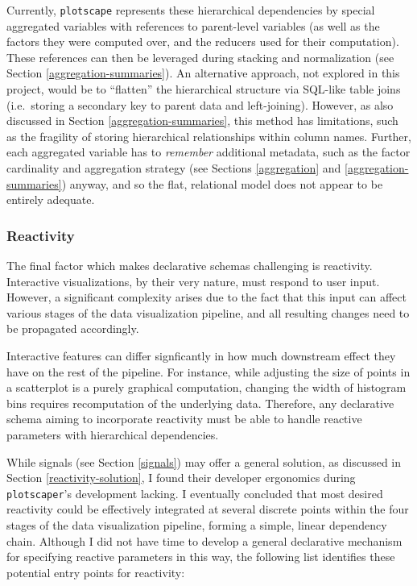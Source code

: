 \documentclass[
  openany]{book}
\theoremstyle{definition}
\theoremstyle{definition}
\theoremstyle{definition}
\theoremstyle{definition}
\theoremstyle{remark}
\begin{document}
Currently, \texttt{plotscape} represents these hierarchical dependencies by special aggregated variables with references to parent-level variables (as well as the factors they were computed over, and the reducers used for their computation). These references can then be leveraged during stacking and normalization (see Section \ref{aggregation-summaries}). An alternative approach, not explored in this project, would be to ``flatten'' the hierarchical structure via SQL-like table joins (i.e.~storing a secondary key to parent data and left-joining). However, as also discussed in Section \ref{aggregation-summaries}, this method has limitations, such as the fragility of storing hierarchical relationships within column names. Further, each aggregated variable has to \emph{remember} additional metadata, such as the factor cardinality and aggregation strategy (see Sections \ref{aggregation} and \ref{aggregation-summaries}) anyway, and so the flat, relational model does not appear to be entirely adequate.

\subsubsection{Reactivity}\label{reactivity-1}

The final factor which makes declarative schemas challenging is reactivity. Interactive visualizations, by their very nature, must respond to user input. However, a significant complexity arises due to the fact that this input can affect various stages of the data visualization pipeline, and all resulting changes need to be propagated accordingly.

Interactive features can differ signficantly in how much downstream effect they have on the rest of the pipeline. For instance, while adjusting the size of points in a scatterplot is a purely graphical computation, changing the width of histogram bins requires recomputation of the underlying data. Therefore, any declarative schema aiming to incorporate reactivity must be able to handle reactive parameters with hierarchical dependencies.

While signals (see Section \ref{signals}) may offer a general solution, as discussed in Section \ref{reactivity-solution}, I found their developer ergonomics during \texttt{plotscaper}'s development lacking. I eventually concluded that most desired reactivity could be effectively integrated at several discrete points within the four stages of the data visualization pipeline, forming a simple, linear dependency chain. Although I did not have time to develop a general declarative mechanism for specifying reactive parameters in this way, the following list identifies these potential entry points for reactivity:
\end{document}
